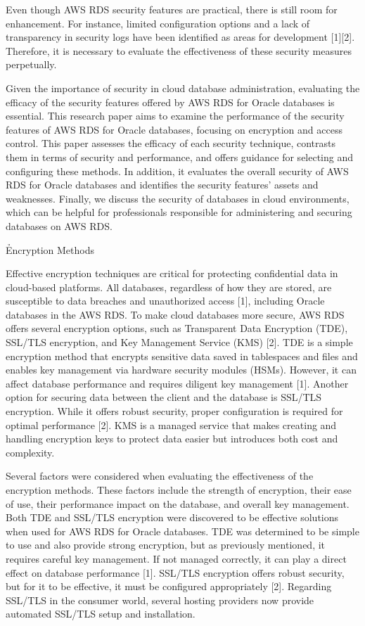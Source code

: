 \documentclass{ieee}
\begin{document}
Even though AWS RDS security features are practical, there is still room for enhancement. For instance, limited configuration options and a lack of transparency in security logs have been identified as areas for development [1][2]. Therefore, it is necessary to evaluate the effectiveness of these security measures perpetually.

Given the importance of security in cloud database administration, evaluating the efficacy of the security features offered by AWS RDS for Oracle databases is essential. This research paper aims to examine the performance of the security features of AWS RDS for Oracle databases, focusing on encryption and access control. This paper assesses the efficacy of each security technique, contrasts them in terms of security and performance, and offers guidance for selecting and configuring these methods. In addition, it evaluates the overall security of AWS RDS for Oracle databases and identifies the security features' assets and weaknesses. Finally, we discuss the security of databases in cloud environments, which can be helpful for professionals responsible for administering and securing databases on AWS RDS.

\h{Encryption Methods}

Effective encryption techniques are critical for protecting confidential data in cloud-based platforms. All databases, regardless of how they are stored, are susceptible to data breaches and unauthorized access [1], including Oracle databases in the AWS RDS. To make cloud databases more secure, AWS RDS offers several encryption options, such as Transparent Data Encryption (TDE), SSL/TLS encryption, and Key Management Service (KMS) [2]. TDE is a simple encryption method that encrypts sensitive data saved in tablespaces and files and enables key management via hardware security modules (HSMs). However, it can affect database performance and requires diligent key management [1]. Another option for securing data between the client and the database is SSL/TLS encryption. While it offers robust security, proper configuration is required for optimal performance [2]. KMS is a managed service that makes creating and handling encryption keys to protect data easier but introduces both cost and complexity.  

Several factors were considered when evaluating the effectiveness of the encryption methods. These factors include the strength of encryption, their ease of use, their performance impact on the database, and overall key management. Both TDE and SSL/TLS encryption were discovered to be effective solutions when used for AWS RDS for Oracle databases. TDE was determined to be simple to use and also provide strong encryption, but as previously mentioned, it requires careful key management. If not managed correctly, it can play a direct effect on database performance [1]. SSL/TLS encryption offers robust security, but for it to be effective, it must be configured appropriately [2]. Regarding SSL/TLS in the consumer world, several hosting providers now provide automated SSL/TLS setup and installation.
\end{document}
